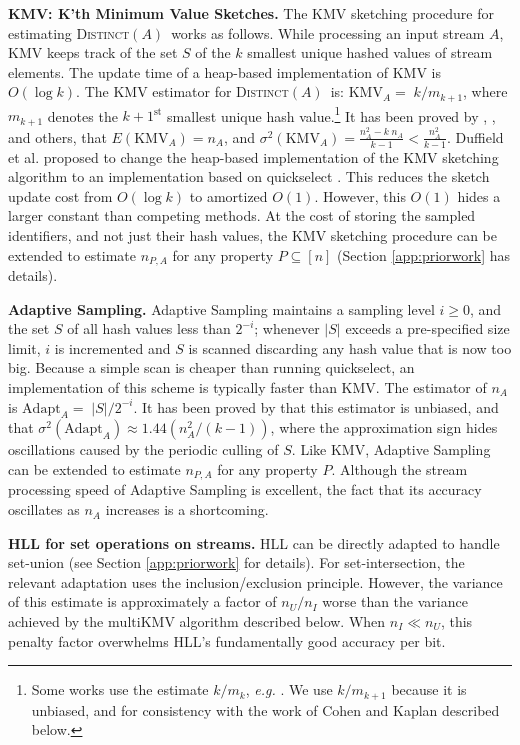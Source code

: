\documentclass{article}
\newcommand{\romKMV}{\mathrm{KMV}}
\newcommand{\romAdapt}{\mathrm{Adapt}}
\newcommand{\romIKMV}{\mathrm{multiKMV}}
\newcommand{\distinctA}{\textsc{Distinct}$(A)$}
\begin{document}
\medskip
\noindent \textbf{KMV: K'th Minimum Value Sketches.} The KMV sketching procedure for estimating \distinctA\ works as follows. While processing an input stream $A$, KMV keeps track of the set $S$ of the $k$ smallest unique hashed values of stream elements.
The update time of a heap-based implementation of KMV is $O(\log k)$.
The KMV estimator for \distinctA\ is: 
$\romKMV_A = \; k / m_{k+1}$, where 
$m_{k+1}$ denotes the $k\!+\!1^{\text{st}}$ smallest unique 
hash value.\footnote{Some works use the estimate $k/m_k$, 
{\em e.g.} 
\cite{bar2002counting}. 
We use $k/m_{k+1}$ 
because it is unbiased, and
for consistency with the work of Cohen and Kaplan \cite{cohen2009leveraging} described below.}
It has been proved by \cite{beyer2009distinct}, \cite{giroire2009order}, and others, that $E(\romKMV_A) = n_A$, and
$\sigma^2(\romKMV_A) = \frac{n_A^2- k \; n_A}{k-1} < \frac{n_A^2}{k-1}.$
Duffield et al. \cite{DuffieldLT07} proposed to change 
the heap-based implementation of the KMV sketching algorithm
to an implementation based on quickselect \cite{quickselect61}. 
This reduces the sketch update cost from $O(\log k)$ to amortized $O(1)$. However, this $O(1)$ hides a larger constant than
competing methods.
At the cost of storing the sampled identifiers, and not just their hash values, the KMV sketching procedure can be extended to estimate $n_{P, A}$ for any property $P \subseteq [n]$ (Section \ref{app:priorwork} has details).

\medskip
\noindent \textbf{Adaptive Sampling.} Adaptive Sampling maintains a sampling level $i \ge 0$, and the set $S$
of all hash values less than $2^{-i}$; whenever $|S|$ exceeds a pre-specified
size limit, $i$ is incremented and $S$ is scanned discarding any hash value
that is now too big. Because a simple scan is cheaper than running
quickselect, an implementation of this scheme is typically faster than
KMV. The estimator of $n_A$ is $\romAdapt_A = \; |S| /
2^{-i}$. It has been proved by \cite{flajolet1990adaptive} that this
estimator is unbiased, and that $\sigma^2(\romAdapt_A) \approx 1.44
(n_A^2/(k-1))$, where the approximation sign hides oscillations caused
by the periodic culling of $S$.  
Like KMV, Adaptive Sampling can be extended to estimate $n_{P, A}$ for any property $P$. Although the stream processing speed of Adaptive Sampling is excellent,
the fact that its accuracy oscillates as $n_A$ increases is a shortcoming.

\medskip
\noindent \textbf{HLL for set operations on streams.} HLL can be directly adapted to handle set-union (see Section \ref{app:priorwork} for details). For set-intersection, the relevant adaptation uses the inclusion/exclusion principle. 
However, the variance of this estimate is approximately a factor of $n_U/n_I$ worse than the variance achieved by
the $\romIKMV$ algorithm described below. When $n_I \ll n_U$, this penalty
factor overwhelms HLL's fundamentally good accuracy per bit.
\end{document}
